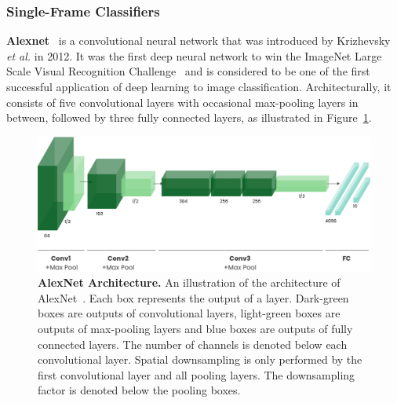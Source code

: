 \documentclass[a4paper]{article}
\begin{document}
\subsubsection{Single-Frame Classifiers} %

\textbf{Alexnet}~\cite{alexnet} is a convolutional neural network that was
introduced by Krizhevsky \textit{et al.} in 2012. It was the first deep neural network to
win the ImageNet Large Scale Visual Recognition Challenge~\cite{imagenet} and is
considered to be one of the first successful application of deep learning to
image classification. Architecturally, it consists of five convolutional layers
with occasional max-pooling layers in between, followed by three fully connected
layers, as illustrated in Figure~\ref{fig:alexnet}.

\begin{figure}
  \centering
  \includegraphics[width=\textwidth]{./figures/alexnet.png}
  \caption{\textbf{AlexNet Architecture.} An illustration of the architecture of
    AlexNet~\cite{alexnet}. Each box represents the output of a layer.
    Dark-green boxes are outputs of convolutional layers, light-green boxes are
    outputs of max-pooling layers and blue boxes are outputs of fully connected
    layers. The number of channels is denoted below each convolutional layer.
    Spatial downsampling is only performed by the first convolutional layer and
    all pooling layers. The downsampling factor is denoted below the pooling
    boxes.
  }
  \label{fig:alexnet}
\end{figure}

\end{document}
